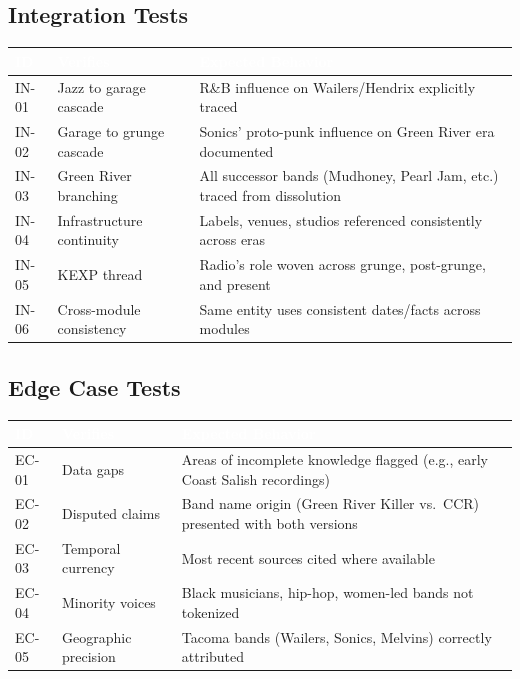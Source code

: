 \documentclass[11pt,letterpaper]{article}
\newcommand{\tableheader}[1]{\textbf{\sffamily\textcolor{white}{#1}}}
\begin{document}
\subsection{Integration Tests}

\begin{center}
\begin{tabularx}{\textwidth}{C{1.2cm}L{3cm}X}
\toprule
{}
\tableheader{ID} & \tableheader{Verifies} & \tableheader{Expected Behavior} \\
\midrule
IN-01 & Jazz to garage cascade & R\&B influence on Wailers/Hendrix explicitly traced \\
IN-02 & Garage to grunge cascade & Sonics' proto-punk influence on Green River era documented \\
IN-03 & Green River branching & All successor bands (Mudhoney, Pearl Jam, etc.) traced from dissolution \\
IN-04 & Infrastructure continuity & Labels, venues, studios referenced consistently across eras \\
IN-05 & KEXP thread & Radio's role woven across grunge, post-grunge, and present \\
IN-06 & Cross-module consistency & Same entity uses consistent dates/facts across modules \\
\bottomrule
\end{tabularx}
\end{center}

\subsection{Edge Case Tests}

\begin{center}
\begin{tabularx}{\textwidth}{C{1.2cm}L{3cm}X}
\toprule
{}
\tableheader{ID} & \tableheader{Verifies} & \tableheader{Expected Behavior} \\
\midrule
EC-01 & Data gaps & Areas of incomplete knowledge flagged (e.g., early Coast Salish recordings) \\
EC-02 & Disputed claims & Band name origin (Green River Killer vs.\ CCR) presented with both versions \\
EC-03 & Temporal currency & Most recent sources cited where available \\
EC-04 & Minority voices & Black musicians, hip-hop, women-led bands not tokenized \\
EC-05 & Geographic precision & Tacoma bands (Wailers, Sonics, Melvins) correctly attributed \\
\bottomrule
\end{tabularx}
\end{center}
\end{document}
